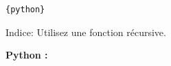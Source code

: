 \begin{Exercice}[15 minutes]
\begin{lstlisting}{python}
    \end{lstlisting}

    \begin{conseil}
    Indice: Utilisez une fonction récursive.
    \end{conseil}

    \begin{solution}
        \textbf{Python :}
        
    \end{solution}

\end{Exercice}



